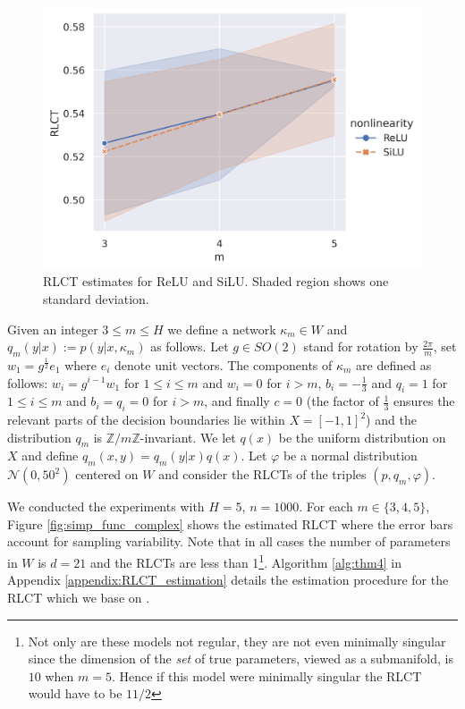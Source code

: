 \documentclass{article} %
\begin{document}
\begin{figure}[h]
\begin{center}
\includegraphics[scale=0.6]{RLCTplot.png}
\end{center}
\caption{RLCT estimates for ReLU and SiLU. Shaded region shows one standard deviation.}
\label{fig:simp_func_complex2}
\end{figure}

Given an integer $3 \le m \le H$ we define a network $\kappa_m \in W$ and $q_m(y|x) := p(y|x, \kappa_m)$ as follows. Let $g \in SO(2)$ stand for rotation by $\frac{2\pi}{m}$, set $w_1 = g^{\tfrac{1}{2}} e_1$ where $e_i$ denote unit vectors. The components of $\kappa_m$ are defined as follows: $w_i = g^{i-1} w_1$ for $1 \le i \le m$ and $w_i = 0$ for $i > m$, $b_i = - \tfrac{1}{3}$ and $q_i = 1$ for $1 \le i \le m$ and $b_i = q_i = 0$ for $i > m$, and finally $c = 0$ (the factor of $\tfrac{1}{3}$ ensures the relevant parts of the decision boundaries lie within $X = [-1,1]^2$) and the distribution $q_m$ is $\mathbb{Z}/m\mathbb{Z}$-invariant. We let $q(x)$ be the uniform distribution on $X$ and define $q_m(x,y) = q_m(y|x) q(x)$. Let $\varphi$ be a normal distribution $\mathcal{N}(0,50^2)$ centered on $W$ and consider the RLCTs of the triples $(p, q_m, \varphi)$. 

We conducted the experiments with $H = 5$, $n = 1000$. For each $m \in \{3,4,5\}$, Figure \ref{fig:simp_func_complex} shows the estimated RLCT where the error bars account for sampling variability. Note that in all cases the number of parameters in $W$ is $d = 21$ and the RLCTs are less than 1\footnote{Not only are these models not regular, they are not even minimally singular since the dimension of the \emph{set} of true parameters, viewed as a submanifold, is $10$ when $m = 5$. Hence if this model were minimally singular the RLCT would have to be $11/2$}. Algorithm \ref{alg:thm4} in Appendix \ref{appendix:RLCT_estimation} details the estimation procedure for the RLCT which we base on \citep[Theorem 4]{watanabe_widely_2013}. 
\end{document}
